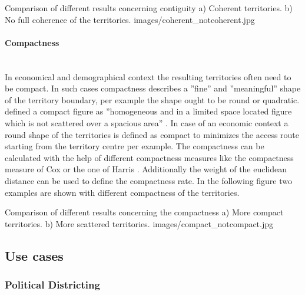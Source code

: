 \begin{figureOwn}{Comparison of different results concerning contiguity a) Coherent territories. b) No full coherence of the territories. }{images/coherent_notcoherent.jpg}\end{figureOwn} 

\paragraph{Compactness}\mbox{} \\

In economical and demographical context the resulting territories often need to be compact. In such cases compactness describes a ''fine'' and ''meaningful'' shape of the territory boundary, per example the shape ought to be round or quadratic. \citeauthor{young} defined a compact figure as ''homogeneous and in a limited space located figure which is not scattered over a spacious area'' \cite{young}. In case of an economic context a round shape of the territories is defined as compact to minimizes the access route starting from the territory centre per example. The compactness can be calculated with the help of different compactness measures like the compactness measure of Cox or the one of Harris \cite{koehler}. Additionally the weight of the euclidean distance can be used to define the compactness rate. In the following figure two examples are shown with different compactness of the territories.

\begin{figureOwn}{Comparison of different results concerning the compactness a) More compact territories. b) More scattered territories. }{images/compact_notcompact.jpg}\end{figureOwn} 


\subsection{Use cases}

\subsubsection{Political Districting}

